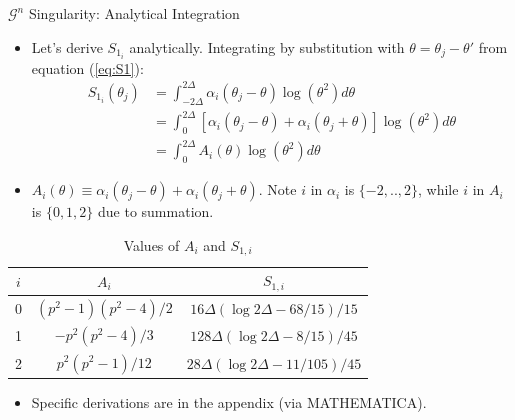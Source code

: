 \documentclass[8pt]{beamer}
\begin{document}
\begin{frame}{\color{white} $\mathcal{G}^n$ Singularity: Analytical Integration}
\begin{itemize}
    \item Let's derive $S_{1_i}$ analytically. Integrating by substitution with $\theta = \theta_j-\theta'$ from equation (\ref{eq:S1}):
    \begin{align}
         S_{1_i}(\theta_j) &= \int_{-2\Delta}^{2\Delta} \alpha_i(\theta_j - \theta) \log(\theta^2) d\theta \\
         &= \int_{0}^{2\Delta} \left[\alpha_i(\theta_j-\theta) + \alpha_i(\theta_j+\theta) \right] \log(\theta^2) d\theta \\
         &= \int_{0}^{2\Delta} A_i(\theta) \log(\theta^2) d\theta
    \end{align}
    \item $A_i(\theta) \equiv \alpha_i(\theta_j - \theta) + \alpha_i(\theta_j + \theta)$. Note $i$ in $\alpha_i$ is $\{-2,..,2\}$, while $i$ in $A_i$ is $\{0,1,2\}$ due to summation.
\end{itemize}
    \begin{table}[h!]
     \centering
     \caption{Values of $A_i$ and $S_{1,i}$}
     \label{table:A_i_and_S_i}
     \begin{tabular}{ccc}
     \hline
     $i$ & $A_i$ & $S_{1,i}$ \\
     \hline
     0 & $(p^2-1)(p^2-4)/2$ & $16\Delta(\log 2\Delta - 68/15)/15$ \\
     1 & $-p^2(p^2-4)/3$ & $128\Delta(\log 2\Delta - 8/15)/45$\\
     2 & $p^2(p^2-1)/12$ & $28\Delta(\log 2\Delta - 11/105)/45$ \\
     \hline
     \end{tabular}
    \end{table}
\begin{itemize}
    \item Specific derivations are in the appendix (via MATHEMATICA).
\end{itemize}
\end{frame}
\end{document}
